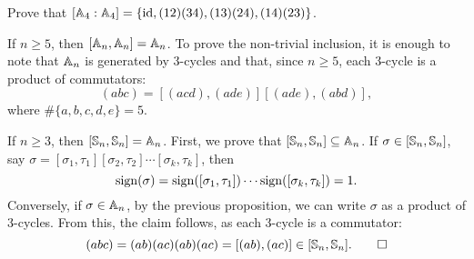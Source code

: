 \begin{exercise}
\label{xca:commutator_A4}
    Prove that $[\mathbb{A}_4:\mathbb{A}_4]=\{\operatorname{id},(12)(34),(13)(24),(14)(23)\}$. 
\end{exercise}

\begin{example}
If $n\geq5$, then $[\mathbb{A}_n,\mathbb{A}_n]=\mathbb{A}_n$. To prove the non-trivial
inclusion, it is enough to note that $\mathbb{A}_n$ is generated by 
3-cycles and that, since $n\geq5$, each 3-cycle 
is a product of commutators: 
\[
(abc)=[(acd),(ade)][(ade),(abd)],
\]
where $\#\{a,b,c,d,e\}=5$.
\end{example}

\begin{example}
If $n\geq3$, then $[\mathbb{S}_n,\mathbb{S}_n]=\mathbb{A}_n$. First, we prove that $[\mathbb{S}_n,\mathbb{S}_n]\subseteq\mathbb{A}_n$. If 
$\sigma\in[\mathbb{S}_n,\mathbb{S}_n]$,
say $\sigma=[\sigma_1,\tau_1][\sigma_2,\tau_2]\cdots[\sigma_k,\tau_k]$, then
\[
\operatorname{sign}(\sigma)=\operatorname{sign}([\sigma_1,\tau_1])\cdots\operatorname{sign}([\sigma_k,\tau_k])=1.
\]
Conversely, if $\sigma\in\mathbb{A}_n$, by the previous proposition, 
we can write $\sigma$ as a product of 3-cycles. 
From this, the claim follows, as each 3-cycle is a commutator: 
\[
(abc)=(ab)(ac)(ab)(ac)=[(ab),(ac)]\in[\mathbb{S}_n,\mathbb{S}_n].\qedhere
\]
\end{example}